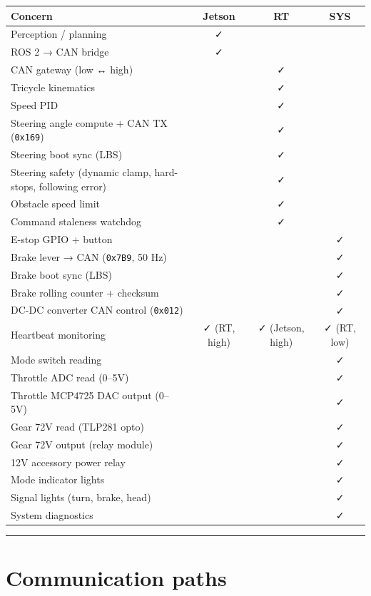 \documentclass[12pt,a4paper,oneside]{report}
\begin{document}
\begin{longtable}[]{@{}lccc@{}}
\toprule\noalign{}
Concern & Jetson & RT & SYS \\
\midrule\noalign{}
\endhead
\bottomrule\noalign{}
\endlastfoot
Perception / planning & ✓ & & \\
ROS 2 → CAN bridge & ✓ & & \\
CAN gateway (low ↔ high) & & ✓ & \\
Tricycle kinematics & & ✓ & \\
Speed PID & & ✓ & \\
Steering angle compute + CAN TX (\texttt{0x169}) & & ✓ & \\
Steering boot sync (LBS) & & ✓ & \\
Steering safety (dynamic clamp, hard-stops, following error) & & ✓ & \\
Obstacle speed limit & & ✓ & \\
Command staleness watchdog & & ✓ & \\
E-stop GPIO + button & & & ✓ \\
Brake lever → CAN (\texttt{0x7B9}, 50 Hz) & & & ✓ \\
Brake boot sync (LBS) & & & ✓ \\
Brake rolling counter + checksum & & & ✓ \\
DC-DC converter CAN control (\texttt{0x012}) & & & ✓ \\
Heartbeat monitoring & ✓ (RT, high) & ✓ (Jetson, high) & ✓ (RT, low) \\
Mode switch reading & & & ✓ \\
Throttle ADC read (0--5V) & & & ✓ \\
Throttle MCP4725 DAC output (0--5V) & & & ✓ \\
Gear 72V read (TLP281 opto) & & & ✓ \\
Gear 72V output (relay module) & & & ✓ \\
12V accessory power relay & & & ✓ \\
Mode indicator lights & & & ✓ \\
Signal lights (turn, brake, head) & & & ✓ \\
System diagnostics & & & ✓ \\
\end{longtable}

\begin{center}\rule{0.5\linewidth}{0.5pt}\end{center}

\section{Communication paths}\label{communication-paths}
\end{document}
